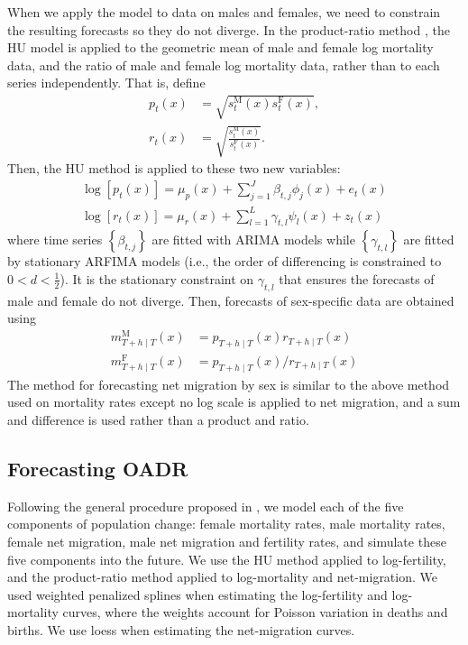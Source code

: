 \documentclass[
  doublespace]{anzsauth}
\begin{document}
When we apply the \citet{HU07} model to data on males and females, we need to constrain the resulting forecasts so they do not diverge. In the product-ratio method \citep{HBY13}, the HU model is applied to the geometric mean of male and female log mortality data, and the ratio of male and female log mortality data, rather than to each series independently. That is, define
\begin{align}
  p_t(x)&=\sqrt{s_{t}^{\text{M}}(x)s_{t}^{\text{F}}(x)}, \label{eq:coherent_1}\\
  r_t(x)&=\sqrt{\frac{s_{t}^{\text{M}}(x)}{s_{t}^{\text{F}}(x)}}. \label{eq:coherent_2}
\end{align}
Then, the HU method is applied to these two new variables:
\begin{align*}
  \log[p_t(x)]=\mu_p(x)+\sum_{j=1}^{J}\beta_{t,j}\phi_j(x)+e_t(x)\\
  \log[r_t(x)]=\mu_r(x)+\sum_{l=1}^{L}\gamma_{t,l}\psi_l(x)+z_t(x)
\end{align*}
where time series \(\left\{\beta_{t,j}\right\}\) are fitted with ARIMA models while \(\left\{\gamma_{t,l}\right\}\) are fitted by stationary ARFIMA models (i.e., the order of differencing is constrained to \(0<d<\frac{1}{2}\)). It is the stationary constraint on \(\gamma_{t,l}\) that ensures the forecasts of male and female do not diverge. Then, forecasts of sex-specific data are obtained using
\begin{align*}
  m_{T+h\mid T}^{\text{M}}(x) & = p_{T+h\mid T}(x)r_{T+h\mid T}(x)\\
  m_{T+h\mid T}^{\text{F}}(x) & = p_{T+h\mid T}(x)/r_{T+h\mid T}(x)
\end{align*}
The method for forecasting net migration by sex is similar to the above method used on mortality rates except no log scale is applied to net migration, and a sum and difference is used rather than a product and ratio.

\hypertarget{forecasting-oadr}{%
\subsection{Forecasting OADR}\label{forecasting-oadr}}

Following the general procedure proposed in \citet{HB08}, we model each of the five components of population change: female mortality rates, male mortality rates, female net migration, male net migration and fertility rates, and simulate these five components into the future. We use the HU method applied to log-fertility, and the product-ratio method applied to log-mortality and net-migration. We used weighted penalized splines \citep{HU07} when estimating the log-fertility and log-mortality curves, where the weights account for Poisson variation in deaths and births. We use loess when estimating the net-migration curves.
\end{document}
